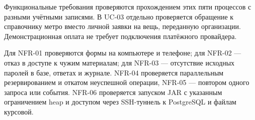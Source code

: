 Функциональные требования проверяются прохождением этих пяти процессов с разными учётными записями. В UC-03 отдельно проверяется обращение к справочнику метро вместо личной заявки на вещь, переданную организации. Демонстрационная оплата не требует подключения платёжного провайдера.

Для NFR-01 проверяются формы на компьютере и телефоне; для NFR-02 — отказ в доступе к чужим материалам; для NFR-03 — отсутствие исходных паролей в базе, ответах и журнале. NFR-04 проверяется параллельным резервированием и откатом неуспешной операции, NFR-05 — повтором одного запроса или события. NFR-06 проверяется запуском JAR с указанным ограничением heap и доступом через SSH-туннель к Postgre\allowbreak{}SQL и файлам курсовой.

